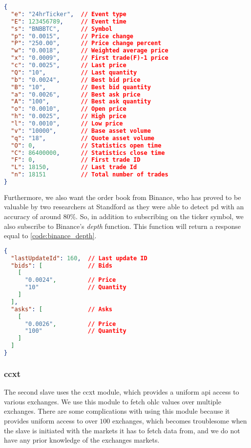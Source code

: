 \begin{lstlisting}[language=json, caption={Ticker response from Binance (Source \cite{binance_git})}, label=code:binance_tick, firstnumber=1]
{
  "e": "24hrTicker",  // Event type
  "E": 123456789,     // Event time
  "s": "BNBBTC",      // Symbol
  "p": "0.0015",      // Price change
  "P": "250.00",      // Price change percent
  "w": "0.0018",      // Weighted average price
  "x": "0.0009",      // First trade(F)-1 price
  "c": "0.0025",      // Last price
  "Q": "10",          // Last quantity
  "b": "0.0024",      // Best bid price
  "B": "10",          // Best bid quantity
  "a": "0.0026",      // Best ask price
  "A": "100",         // Best ask quantity
  "o": "0.0010",      // Open price
  "h": "0.0025",      // High price
  "l": "0.0010",      // Low price
  "v": "10000",       // Base asset volume
  "q": "18",          // Quote asset volume
  "O": 0,             // Statistics open time
  "C": 86400000,      // Statistics close time
  "F": 0,             // First trade ID
  "L": 18150,         // Last trade Id
  "n": 18151          // Total number of trades
}
\end{lstlisting}

Furthermore, we also want the order book from Binance, who has proved to be valuable by two researchers at Standford as they were able to detect \ac{pd} with an accuracy of around $80\%$. So, in addition to subscribing on the ticker symbol, we also subscribe to Binance's \emph{depth} function. This function will return a response equal to \autoref{code:binance_depth}.

\begin{lstlisting}[language=json, caption={Depth response from Binance (Source \cite{binance_git})}, label=code:binance_depth, firstnumber=1]
{
  "lastUpdateId": 160,  // Last update ID
  "bids": [             // Bids
    [
      "0.0024",         // Price
      "10"              // Quantity
    ]
  ],
  "asks": [             // Asks
    [
      "0.0026",         // Price
      "100"             // Quantity
    ]
  ]
}
\end{lstlisting}

\subsubsection{ccxt}
The second slave uses the ccxt module, which provides a uniform \ac{api} access to various exchanges. We use this module to fetch \ac{ohlc} values over multiple exchanges. There are some complications with using this module because it provides uniform access to over $100$ exchanges, which becomes troublesome when the slave is initiated with the markets it has to fetch data from, and we do not have any prior knowledge of the exchanges markets.

